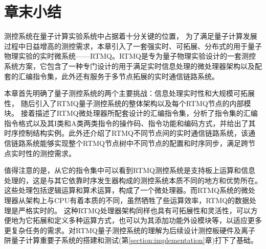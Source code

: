 \newpage
\section[章末小结]{章末小结}

测控系统在量子计算实验系统中占据着十分关键的位置，
为了满足量子计算发展过程中日益增高的测控需求，本章引入了一套强实时、可拓展、分布式的用于量子物理实验的实时微系统——RTMQ。RTMQ是专为量子物理实验设计的一套测控系统方案，它包含了一种专门设计的用于满足实时信息处理的微处理器架构以及配套的汇编指令集，此外还有服务于多节点拓展的实时通信链路系统。

本章首先明确了量子测控系统的两个主要挑战：信息处理实时性和大规模可拓展性，
随后引入了RTMQ量子测控系统的整体架构以及每个RTMQ节点的内部模块。
接着描述了RTMQ微处理器所配套设计的汇编指令集，分析了指令集的汇编指令格式以及其I类和A类两类指令的操作码、指令功能和编码方式，并给出了其时序控制结构实例。此外还介绍了RTMQ不同节点间的实时通信链路系统，该通信链路系统能够实现整个RTMQ节点树中不同节点的配置和时序同步，满足跨节点实时性的测控需求。

值得注意的是，从它的指令集中可以看到RTMQ测控系统是支持板上运算和信息处理的，这是与其它依靠时序发生器构成的测控系统本质不同的地方和优势所在。这些处理包括逻辑运算和算术运算，构成了一个微处理器。而RTMQ系统的微处理器从架构上与CPU有着本质的不同，虽然牺牲了些运算效率，RTMQ的数据处理是严格实时的。
这种RTMQ处理器架构同样也具有可拓展性和灵活性，可以方便地为它拓展和定义多种运算方式，也可以为其添加功能外设模块等，以适应更多更复杂任务的需求。对RTMQ量子测控系统的理解为后续设计测控板硬件及离子阱量子计算重要子系统的搭建和测试(第\ref{section:implementation}章)打下了基础。
